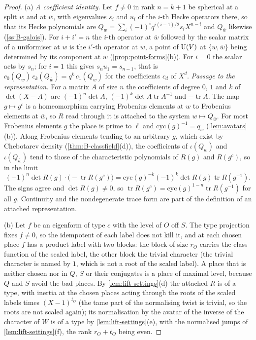 \begin{proof}
(a) \emph{A coefficient identity.} Let $f\ne0$ in rank $n=k+1$ be spherical at a split $w$ and at $\bar w$, with eigenvalues $s_i$ and $u_i$ of the $i$-th Hecke operators there, so that its Hecke polynomials are
$Q_w=\sum_i(-1)^iq^{i(i-1)/2}s_iX^{n-i}$ and $Q_{\bar w}$ likewise (\cref{ss:B-galois}). For $i+i'=n$ the $i$-th operator at $\bar w$ followed by the scalar matrix of a uniformiser at $w$ is the $i'$-th operator at $w$, a point of
$\operatorname{U}(V)$ at $\{w,\bar w\}$ being determined by its component at $w$ (\cref{prop:point-forms}(b)). For $i=0$ the scalar acts by $s_n$; for $i=1$ this gives $s_nu_1=s_{n-1}$, that is $c_0(Q_w)\,c_k(Q_{\bar w})=q^k\,c_1(Q_w)$ for the
coefficients $c_d$ of $X^d$. \emph{Passage to the representation.} For a matrix $A$ of size $n$ the coefficients of degree $0$, $1$ and $k$ of $\det(X-A)$ are $(-1)^n\det A$, $(-1)^{k}\det A\operatorname{tr}A^{-1}$ and $-\operatorname{tr}A$. The map
$g\mapsto g^c$ is a homeomorphism carrying Frobenius elements at $w$ to Frobenius elements at $\bar w$, so $R$ read through it is attached to the system $w\mapsto Q_{\bar w}$. For most Frobenius elements $g$ the place is prime to
$\ell$ and $\mathrm{cyc}(g)^{-1}=q_w$ (\cref{lem:avatars}(b)). Along Frobenius elements tending to an arbitrary $g$, which exist by Chebotarev density (\cref{thm:B-classfield}(d)), the coefficients of $\iota(Q_w)$ and $\iota(Q_{\bar w})$
tend to those of the characteristic polynomials of $R(g)$ and $R(g^c)$, so in the limit
\[
  (-1)^n\det R(g)\cdot\bigl(-\operatorname{tr}R(g^c)\bigr)=\mathrm{cyc}(g)^{-k}(-1)^k\det R(g)\operatorname{tr}R(g^{-1}).
\]
The signs agree and $\det R(g)\ne0$, so $\operatorname{tr}R(g^c)=\mathrm{cyc}(g)^{1-n}\operatorname{tr}R(g^{-1})$ for all $g$.
Continuity and the nondegenerate trace form are part of the definition of an attached representation.

(b) Let $f$ be an eigenform of type $c$ with the level of $O$ off $S$. The type projection fixes $f\ne0$, so the idempotent of each label does not kill it, and at each chosen place $f$ has a product label with two blocks: the block
of size $r_O$ carries the class function of the scaled label, the other block the trivial character (the trivial character is named by $1$, which is not a root of the scaled label). A place that is neither chosen nor in $Q$, $S$
or their conjugates is a place of maximal level, because $Q$ and $S$ avoid the bad places. By \cref{lem:lift-settings}(d) the attached $R$ is of a type, with inertia at the chosen places acting through the roots of the scaled
labels times $(X-1)^{t_O}$ (the tame part of the normalising twist is trivial, so the roots are not scaled again); its normalisation by the avatar of the inverse of the character of $W$ is of a type by
\cref{lem:lift-settings}(e), with the normalised jumps of \cref{lem:lift-settings}(f), the rank $r_O+t_O$ being even.


\end{proof}
